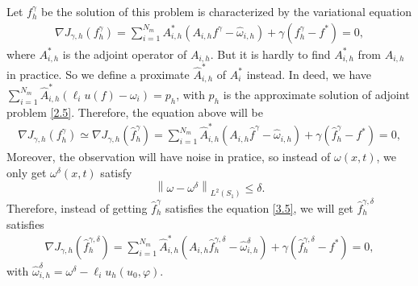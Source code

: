 \documentclass[]{article}
\begin{document}
Let $f^\gamma_h$ be the solution of this problem is characterized by the variational equation
\begin{align}\label{3.4}
	\nabla J_{\gamma, h}(f^\gamma_h)= \sum_{i=1}^{N_m}A_{i, h}^*(A_{i, h}f^\gamma-\hat{\omega}_{i, h})+\gamma(f^\gamma_h-f^*)=0,
\end{align}
where $A_{i, h}^*$ is the adjoint operator of $A_{i, h}$. But it is hardly to find $A^*_{i, h}$ from $A_{i, h}$ in practice. So we define a proximate $\hat{A}_{i, h}^*$ of $A_i^*$ instead. In deed, we have $\sum_{i=1}^{N_m}\hat{A}^*_{i, h}\left(\ell_i u(f) - \omega_i\right)=p_h$, with $p_h$ is the approximate solution of adjoint problem \eqref{2.5}. Therefore, the equation above will be
\begin{align}\label{3.5}
	\nabla J_{\gamma, h}(f^\gamma_h)\simeq\nabla J_{\gamma, h}(\hat{f}^\gamma_h)= \sum_{i=1}^{N_m}\hat{A}_{i, h}^*(A_{i, h}\hat{f}^\gamma-\hat{\omega}_{i, h})+\gamma(\hat{f}^\gamma_h-f^*)=0,
\end{align}
Moreover, the observation will have noise in pratice, so instead of $\omega(x, t)$, we only get $\omega^{\delta}(x, t)$ satisfy
$$\left\| \omega-\omega^\delta\right\|_{L^2(S_1)}\leq \delta.$$
Therefore, instead of getting $\hat{f}^\gamma_h$ satisfies the equation \eqref{3.5}, we will get $\hat{f}^{\gamma, \delta}_h$ satisfies
\begin{align}\label{3.6}
	\nabla J_{\gamma, h}\left(\hat{f}^{\gamma, \delta}_h\right)= \sum_{i=1}^{N_m}\hat{A}_{i, h}^*(A_{i, h}\hat{f}^{\gamma, \delta}_h-\hat{\omega}_{i, h}^\delta)+\gamma(\hat{f}^{\gamma, \delta}_h-f^*)=0,
\end{align}
with $\hat{\omega}_{i, h}^\delta=\omega^\delta-\ell_i u_h(u_0, \varphi)$.
\end{document}
